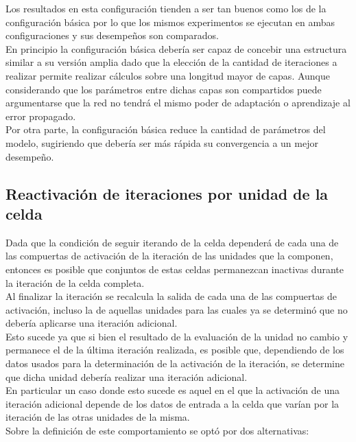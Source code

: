 \documentclass{article}
\begin{document}
Los resultados en esta configuración tienden a ser tan buenos como los de la configuración básica por lo que los mismos experimentos se ejecutan en ambas configuraciones y sus desempeños son comparados.\\

En principio la configuración básica debería ser capaz de concebir una estructura similar a su versión amplia dado que la elección de la cantidad de iteraciones a realizar permite realizar cálculos sobre una longitud mayor de capas. Aunque considerando que los parámetros entre dichas capas son compartidos puede argumentarse que la red no tendrá el mismo poder de adaptación o aprendizaje al error propagado.\\

Por otra parte, la configuración básica reduce la cantidad de parámetros del modelo, sugiriendo que debería ser más rápida su convergencia a un mejor desempeño.\\

\subsection{Reactivación de iteraciones por unidad de la celda}
Dada que la condición de seguir iterando de la celda dependerá de cada una de las compuertas de activación de la iteración de las unidades que la componen, entonces es posible que conjuntos de estas celdas permanezcan inactivas durante la iteración de la celda completa.\\

Al finalizar la iteración se recalcula la salida de cada una de las compuertas de activación, incluso la de aquellas unidades para las cuales ya se determinó que no debería aplicarse una iteración adicional.\\

Esto sucede ya que si bien el resultado de la evaluación de la unidad no cambio y permanece el de la última iteración realizada, es posible que, dependiendo de los datos usados para la determinación de la activación de la iteración, se determine que dicha unidad debería realizar una iteración adicional.\\

En particular un caso donde esto sucede es aquel en el que la activación de una iteración adicional depende de los datos de entrada a la celda que varían por la iteración de las otras unidades de la misma.\\

Sobre la definición de este comportamiento se optó por dos alternativas:
\end{document}
